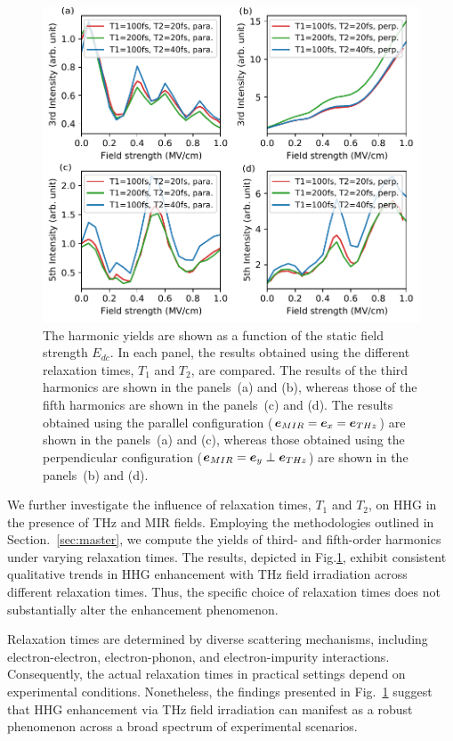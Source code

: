 \begin{figure}[tb]
\includegraphics[width=0.9\linewidth]{pic/SI_t1t2.pdf}
\caption{\label{fig:intensity_relaxation}
The harmonic yields are shown as a function of the static field strength $E_{dc}$. In each panel, the results obtained using the different relaxation times, $T_1$ and $T_2$, are compared. The results of the third harmonics are shown in the panels~(a) and (b), whereas those of the fifth harmonics are shown in the panels~(c) and (d). The results obtained using the parallel configuration ($\boldsymbol e_{MIR}=\boldsymbol e_x = \boldsymbol e_{THz}$) are shown in the panels~(a) and (c), whereas those obtained using the perpendicular configuration ($\boldsymbol e_{MIR}=\boldsymbol e_y \perp \boldsymbol e_{THz}$) are shown in the panels~(b) and (d).
}
\end{figure}

We further investigate the influence of relaxation times, $T_1$ and $T_2$, on HHG in the presence
of THz and MIR fields. Employing the methodologies outlined in Section.~\ref{sec:master}, we compute the yields of third- and fifth-order harmonics under varying relaxation times. The results, depicted in Fig.\ref{fig:intensity_relaxation}, exhibit consistent qualitative trends in HHG enhancement with THz field irradiation across different relaxation times. Thus, the specific choice of relaxation times does not substantially alter the enhancement phenomenon.

Relaxation times are determined by diverse scattering mechanisms, including electron-electron,
electron-phonon, and electron-impurity interactions. Consequently, the actual relaxation times in
practical settings depend on experimental conditions. Nonetheless, the findings presented in
Fig.~\ref{fig:intensity_relaxation} suggest that HHG enhancement via THz field irradiation can
manifest as a robust phenomenon across a broad spectrum of experimental scenarios.


